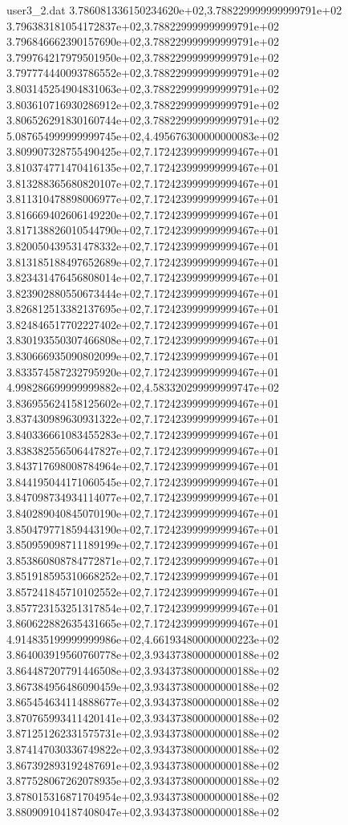 \begin{filecontents}{user3_2.dat}
3.786081336150234620e+02,3.788229999999999791e+02
3.796383181054172837e+02,3.788229999999999791e+02
3.796846662390157690e+02,3.788229999999999791e+02
3.799764217979501950e+02,3.788229999999999791e+02
3.797774440093786552e+02,3.788229999999999791e+02
3.803145254904831063e+02,3.788229999999999791e+02
3.803610716930286912e+02,3.788229999999999791e+02
3.806526291830160744e+02,3.788229999999999791e+02
5.087654999999999745e+02,4.495676300000000083e+02
3.809907328755490425e+02,7.172423999999999467e+01
3.810374771470416135e+02,7.172423999999999467e+01
3.813288365680820107e+02,7.172423999999999467e+01
3.811310478898006977e+02,7.172423999999999467e+01
3.816669402606149220e+02,7.172423999999999467e+01
3.817138826010544790e+02,7.172423999999999467e+01
3.820050439531478332e+02,7.172423999999999467e+01
3.813185188497652689e+02,7.172423999999999467e+01
3.823431476456808014e+02,7.172423999999999467e+01
3.823902880550673444e+02,7.172423999999999467e+01
3.826812513382137695e+02,7.172423999999999467e+01
3.824846517702227402e+02,7.172423999999999467e+01
3.830193550307466808e+02,7.172423999999999467e+01
3.830666935090802099e+02,7.172423999999999467e+01
3.833574587232795920e+02,7.172423999999999467e+01
4.998286699999999882e+02,4.583320299999999747e+02
3.836955624158125602e+02,7.172423999999999467e+01
3.837430989630931322e+02,7.172423999999999467e+01
3.840336661083455283e+02,7.172423999999999467e+01
3.838382556506447827e+02,7.172423999999999467e+01
3.843717698008784964e+02,7.172423999999999467e+01
3.844195044171060545e+02,7.172423999999999467e+01
3.847098734934114077e+02,7.172423999999999467e+01
3.840289040845070190e+02,7.172423999999999467e+01
3.850479771859443190e+02,7.172423999999999467e+01
3.850959098711189199e+02,7.172423999999999467e+01
3.853860808784772871e+02,7.172423999999999467e+01
3.851918595310668252e+02,7.172423999999999467e+01
3.857241845710102552e+02,7.172423999999999467e+01
3.857723153251317854e+02,7.172423999999999467e+01
3.860622882635431665e+02,7.172423999999999467e+01
4.914835199999999986e+02,4.661934800000000223e+02
3.864003919560760778e+02,3.934373800000000188e+02
3.864487207791446508e+02,3.934373800000000188e+02
3.867384956486090459e+02,3.934373800000000188e+02
3.865454634114888677e+02,3.934373800000000188e+02
3.870765993411420141e+02,3.934373800000000188e+02
3.871251262331575731e+02,3.934373800000000188e+02
3.874147030336749822e+02,3.934373800000000188e+02
3.867392893192487691e+02,3.934373800000000188e+02
3.877528067262078935e+02,3.934373800000000188e+02
3.878015316871704954e+02,3.934373800000000188e+02
3.880909104187408047e+02,3.934373800000000188e+02

\end{filecontents}
